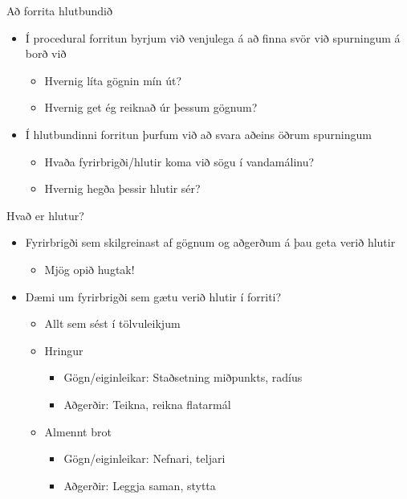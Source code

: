 \documentclass{beamer}
\begin{document}
\begin{frame}{Að forrita hlutbundið}
 \begin{itemize}
  \item Í procedural forritun byrjum við venjulega á að finna svör við spurningum á borð við
  \begin{itemize}
   \item Hvernig líta gögnin mín út?
   \item Hvernig get ég reiknað úr þessum gögnum?
  \end{itemize}
  \item Í hlutbundinni forritun þurfum við að svara aðeins öðrum spurningum
  \begin{itemize}
   \item Hvaða fyrirbrigði/hlutir koma við sögu í vandamálinu?
   \item Hvernig hegða þessir hlutir sér?
  \end{itemize}
 \end{itemize}
\end{frame}


\begin{frame}{Hvað er hlutur?}
\pause
\begin{itemize}
 \item Fyrirbrigði sem skilgreinast af gögnum og aðgerðum á þau geta verið hlutir
 \begin{itemize}
  \item Mjög opið hugtak! \pause
 \end{itemize}
 \item Dæmi um fyrirbrigði sem gætu verið hlutir í forriti? \pause
 \begin{itemize}
  \item Allt sem sést í tölvuleikjum
  \item Hringur
  \begin{itemize}
   \item Gögn/eiginleikar: Staðsetning miðpunkts, radíus
   \item Aðgerðir: Teikna, reikna flatarmál
  \end{itemize} 
  \item Almennt brot
  \begin{itemize}
   \item Gögn/eiginleikar: Nefnari, teljari
   \item Aðgerðir: Leggja saman, stytta
  \end{itemize}
 \end{itemize}
\end{itemize}
\end{frame}
\end{document}
